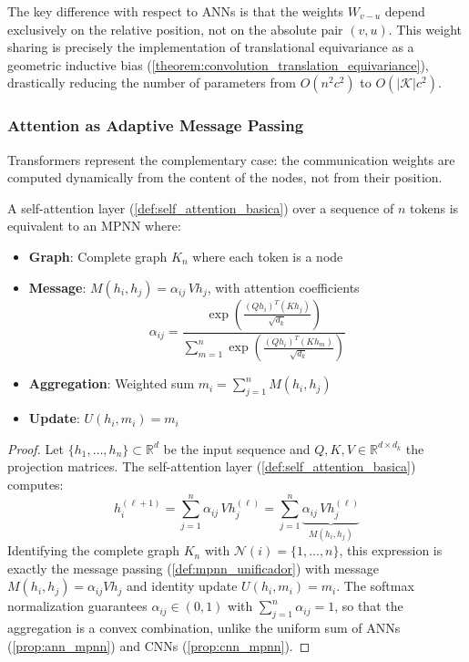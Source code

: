The key difference with respect to \glspl{ANN} is that the weights $W_{v-u}$ depend exclusively on the relative position, not on the absolute pair $(v, u)$. This weight sharing is precisely the implementation of translational equivariance as a geometric inductive bias (\autoref{theorem:convolution_translation_equivariance}), drastically reducing the number of parameters from $O(n^2 c^2)$ to $O(|\mathcal{K}| c^2)$.

\subsubsection{Attention as Adaptive Message Passing}

\glspl{Transformer} represent the complementary case: the communication weights are computed dynamically from the content of the nodes, not from their position.

\begin{proposition}\label{prop:attention_mpnn}
A self-attention layer (\autoref{def:self_attention_basica}) over a sequence of $n$ tokens is equivalent to an \gls{MPNN} where:
\begin{itemize}
    \item \textbf{Graph}: Complete graph $K_n$ where each token is a node
    \item \textbf{Message}: $M(h_i, h_j) = \alpha_{ij}\, V h_j$, with attention coefficients
    \[
    \alpha_{ij} = \frac{\exp\!\left(\frac{(Qh_i)^T(Kh_j)}{\sqrt{d_k}}\right)}{\sum_{m=1}^n \exp\!\left(\frac{(Qh_i)^T(Kh_m)}{\sqrt{d_k}}\right)}
    \]
    \item \textbf{Aggregation}: Weighted sum $m_i = \sum_{j=1}^n M(h_i, h_j)$
    \item \textbf{Update}: $U(h_i, m_i) = m_i$
\end{itemize}
\end{proposition}

\begin{proof}
Let $\{h_1, \ldots, h_n\} \subset \mathbb{R}^d$ be the input sequence and $Q, K, V \in \mathbb{R}^{d \times d_k}$ the projection matrices. The self-attention layer (\autoref{def:self_attention_basica}) computes:
\[
h_i^{(\ell+1)} = \sum_{j=1}^n \alpha_{ij}\, V h_j^{(\ell)}
= \sum_{j=1}^n \underbrace{\alpha_{ij}\, V h_j^{(\ell)}}_{M(h_i, h_j)}
\]
Identifying the complete graph $K_n$ with $\mathcal{N}(i) = \{1, \ldots, n\}$, this expression is exactly the message passing (\autoref{def:mpnn_unificador}) with message $M(h_i, h_j) = \alpha_{ij} V h_j$ and identity update $U(h_i, m_i) = m_i$. The softmax normalization guarantees $\alpha_{ij} \in (0,1)$ with $\sum_{j=1}^n \alpha_{ij} = 1$, so that the aggregation is a convex combination, unlike the uniform sum of \glspl{ANN} (\autoref{prop:ann_mpnn}) and \glspl{CNN} (\autoref{prop:cnn_mpnn}).
\end{proof}

